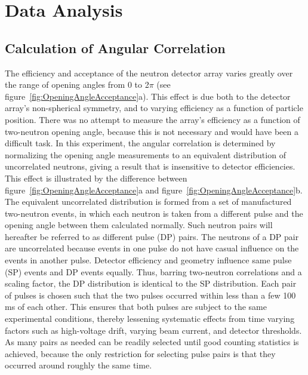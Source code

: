 \section{Data Analysis}
\label{Analysis}
\subsection{Calculation of Angular Correlation}
The efficiency and acceptance of the neutron detector array varies greatly over the range of opening angles from 0 to 2$\pi$ (see figure~\ref{fig:OpeningAngleAcceptance}a).
This effect is due both to the detector array's non-spherical symmetry, and to varying efficiency as a function of particle position.
There was no attempt to measure the array's efficiency as a function of two-neutron opening angle, because this is not necessary and would have been a difficult task.
In this experiment, the angular correlation is determined by normalizing the opening angle measurements to an equivalent distribution of uncorrelated neutrons, giving a result that is insensitive to detector efficiencies.
This effect is illustrated by the difference between figure~\ref{fig:OpeningAngleAcceptance}a and figure~\ref{fig:OpeningAngleAcceptance}b.
The equivalent uncorrelated distribution is formed from a set of manufactured two-neutron events, in which each neutron is taken from a different pulse and the opening angle between them calculated normally.
Such neutron pairs will hereafter be referred to as different pulse (DP) pairs.
The neutrons of a DP pair are uncorrelated because events in one pulse do not have casual influence on the events in another pulse.
Detector efficiency and geometry influence same pulse (SP) events and DP events equally.
Thus, barring two-neutron correlations and a scaling factor, the DP distribution is identical to the SP distribution.
Each pair of pulses is chosen such that the two pulses occurred within less than a few 100 ms of each other.
This ensures that both pulses are subject to the same experimental conditions, thereby lessening systematic effects from time varying factors such as high-voltage drift, varying beam current, and detector thresholds.
As many pairs as needed can be readily selected until good counting statistics is achieved, because the only restriction for selecting pulse pairs is that they occurred around roughly the same time.
